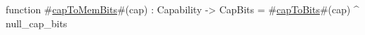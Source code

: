 function #\hyperref[sailRISCVzcapToMemBits]{capToMemBits}#(cap) : Capability -> CapBits =
  #\hyperref[sailRISCVzcapToBits]{capToBits}#(cap) ^ null_cap_bits

